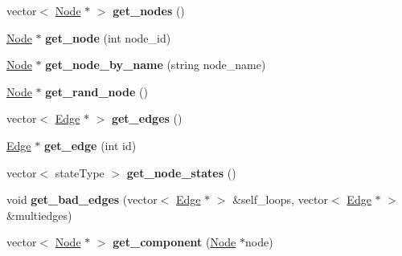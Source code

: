 \begin{DoxyCompactItemize}
\item 
\hypertarget{classNetwork_ace9c30eb87c661132f910fb1345afc48}{}vector$<$ \hyperlink{classNode}{Node} $\ast$ $>$ {\bfseries get\+\_\+nodes} ()\label{classNetwork_ace9c30eb87c661132f910fb1345afc48}

\item 
\hypertarget{classNetwork_a709ce39807cad7c87f13692d26c87274}{}\hyperlink{classNode}{Node} $\ast$ {\bfseries get\+\_\+node} (int node\+\_\+id)\label{classNetwork_a709ce39807cad7c87f13692d26c87274}

\item 
\hypertarget{classNetwork_aeabfba6ab4874667882749594de7dada}{}\hyperlink{classNode}{Node} $\ast$ {\bfseries get\+\_\+node\+\_\+by\+\_\+name} (string node\+\_\+name)\label{classNetwork_aeabfba6ab4874667882749594de7dada}

\item 
\hypertarget{classNetwork_ad9312ef8bc67d27066cfbebc8794e313}{}\hyperlink{classNode}{Node} $\ast$ {\bfseries get\+\_\+rand\+\_\+node} ()\label{classNetwork_ad9312ef8bc67d27066cfbebc8794e313}

\item 
\hypertarget{classNetwork_a7c009bf7dde31ee211045212f47b0710}{}vector$<$ \hyperlink{classEdge}{Edge} $\ast$ $>$ {\bfseries get\+\_\+edges} ()\label{classNetwork_a7c009bf7dde31ee211045212f47b0710}

\item 
\hypertarget{classNetwork_afd8a3ade922ecd10c333b5d3bb3621de}{}\hyperlink{classEdge}{Edge} $\ast$ {\bfseries get\+\_\+edge} (int id)\label{classNetwork_afd8a3ade922ecd10c333b5d3bb3621de}

\item 
\hypertarget{classNetwork_a99010c3efb17d60477fd48b2b667d783}{}vector$<$ state\+Type $>$ {\bfseries get\+\_\+node\+\_\+states} ()\label{classNetwork_a99010c3efb17d60477fd48b2b667d783}

\item 
\hypertarget{classNetwork_a4a3afc7f166ccaf84560740ca9a4caaa}{}void {\bfseries get\+\_\+bad\+\_\+edges} (vector$<$ \hyperlink{classEdge}{Edge} $\ast$ $>$ \&self\+\_\+loops, vector$<$ \hyperlink{classEdge}{Edge} $\ast$ $>$ \&multiedges)\label{classNetwork_a4a3afc7f166ccaf84560740ca9a4caaa}

\item 
\hypertarget{classNetwork_a2787d023f770195e241442cd5934ac6c}{}vector$<$ \hyperlink{classNode}{Node} $\ast$ $>$ {\bfseries get\+\_\+component} (\hyperlink{classNode}{Node} $\ast$node)\label{classNetwork_a2787d023f770195e241442cd5934ac6c}


\end{DoxyCompactItemize}
